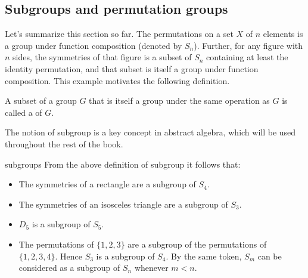 \subsection{Subgroups and permutation groups}

Let's summarize this section so far.  The permutations on a set $X$ of $n$ elements is a group under function composition (denoted by  $S_n$).  Further, for any figure with $n$ sides, the symmetries of that figure is a subset of $S_n$ containing at least the identity permutation, and that subset is itself a group under function composition.  This example motivates the following definition.

\begin{defn}\label{def_subgroup}
A subset of a group $G$ that is itself a group under the same operation as $G$ is called a  of $G$.  
\end{defn}

The notion of subgroup is a key concept in abstract algebra, which will be used throughout the rest of the book.  

\begin{example}{subgroups}
From the above definition of subgroup it follows that:
\begin{itemize}
\item
The symmetries of a rectangle are a subgroup of $S_4$. 
\item
The symmetries of an isosceles triangle are a subgroup of $S_3$.
\item
$D_5$ is a subgroup of $S_5$.
\item
The permutations of $\{1,2,3\}$ are a subgroup of the permutations of $\{1,2,3,4\}$. Hence $S_3$ is a subgroup of $S_4$. By the same token, $S_m$ can be considered as a subgroup of $S_n$ whenever $m < n$.
\end{itemize}
\end{example}



